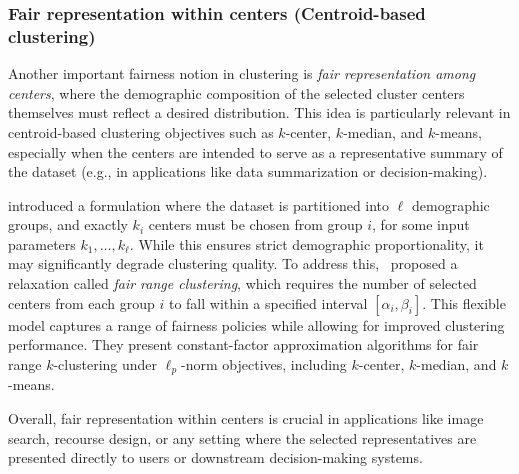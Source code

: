 \subsubsection{Fair representation within centers (Centroid-based clustering)}
Another important fairness notion in clustering is \emph{fair representation among centers}, where the demographic composition of the selected cluster centers themselves must reflect a desired distribution. This idea is particularly relevant in centroid-based clustering objectives such as $k$-center, $k$-median, and $k$-means, especially when the centers are intended to serve as a representative summary of the dataset (e.g., in applications like data summarization or decision-making).

\citet{kleindessner2019fair} introduced a formulation where the dataset is partitioned into $\ell$ demographic groups, and exactly $k_i$ centers must be chosen from group $i$, for some input parameters $k_1, \dots, k_\ell$. While this ensures strict demographic proportionality, it may significantly degrade clustering quality. To address this,~\citep{hotegni2023approximation,nguyen2022fair} proposed a relaxation called \emph{fair range clustering}, which requires the number of selected centers from each group $i$ to fall within a specified interval $[\alpha_i, \beta_i]$. This flexible model captures a range of fairness policies while allowing for improved clustering performance. They present constant-factor approximation algorithms for fair range $k$-clustering under $\ell_p$-norm objectives, including $k$-center, $k$-median, and $k$-means.


Overall, fair representation within centers is crucial in applications like image search, recourse design, or any setting where the selected representatives are presented directly to users or downstream decision-making systems.


